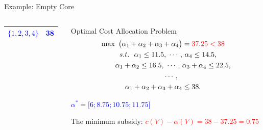 \documentclass[14pt]{beamer}
\begin{document}
\begin{frame}{Example: Empty Core}
\begin{columns}
\begin{column}{4.5cm}
\begin{table}[H]
\begin{tabular}[!h]{c c }
\textcolor{blue}{$\{1,2,3,4\}$}	&\textcolor{blue}{38}	\\
\hline
\end{tabular}
\end{table}
\end{column}
\pause
\begin{column}{6.5cm}
\footnotesize
\vspace{-1.5em}
\begin{shaded}
\centering
Optimal Cost Allocation Problem
\begin{eqnarray*}
\begin{aligned}
\max ~\big(\alpha_1 + \alpha_2 + \alpha_3 + \alpha_4\big) &= \textcolor{red}{37.25 < 38}\\
s.t.~~ \alpha_1 \leq 11.5,~\cdots,&~\alpha_4 \leq 14.5,\\
\alpha_1 + \alpha_2 \leq 16.5,~\cdots,~ &\alpha_3+\alpha_4 \leq 22.5,\\
~~~~~~~~~~\cdots,~~&\\
\alpha_1 + \alpha_2 + \alpha_3 + \alpha_4 &\leq 38.
\end{aligned}
\end{eqnarray*}
\vspace{-0.5em}
\end{shaded}
\begin{shaded}
\centering
\textcolor{blue}{
$\alpha^* = \big[6;8.75;10.75;11.75\big]$}
\end{shaded}
\begin{shaded}
\centering
The minimum subsidy:
\textcolor{red}{
$c(V)-\alpha(V) = 38-37.25 = 0.75$}
\end{shaded}
\end{column}
\end{columns}
\end{frame}
\end{document}
